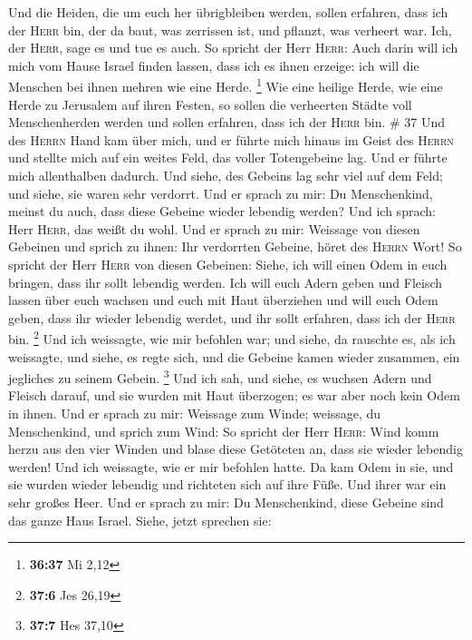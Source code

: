  Und die Heiden, die um euch her übrigbleiben werden,
sollen erfahren, dass ich der \textsc{Herr} bin, der da baut, was
zerrissen ist, und pflanzt, was verheert war. Ich, der \textsc{Herr},
sage es und tue es auch.  So spricht der Herr
\textsc{Herr}: Auch darin will ich mich vom Hause Israel finden lassen,
dass ich es ihnen erzeige: ich will die Menschen bei ihnen mehren wie
eine Herde. \footnote{\textbf{36:37} Mi 2,12}  Wie eine
heilige Herde, wie eine Herde zu Jerusalem auf ihren Festen, so sollen
die verheerten Städte voll Menschenherden werden und sollen erfahren,
dass ich der \textsc{Herr} bin. \# 37  Und des
\textsc{Herrn} Hand kam über mich, und er führte mich hinaus im Geist
des \textsc{Herrn} und stellte mich auf ein weites Feld, das voller
Totengebeine lag.  Und er führte mich allenthalben
dadurch. Und siehe, des Gebeins lag sehr viel auf dem Feld; und siehe,
sie waren sehr verdorrt.  Und er sprach zu mir: Du
Menschenkind, meinst du auch, dass diese Gebeine wieder lebendig werden?
Und ich sprach: Herr \textsc{Herr}, das weißt du wohl. 
Und er sprach zu mir: Weissage von diesen Gebeinen und sprich zu ihnen:
Ihr verdorrten Gebeine, höret des \textsc{Herrn} Wort!  So
spricht der Herr \textsc{Herr} von diesen Gebeinen: Siehe, ich will
einen Odem in euch bringen, dass ihr sollt lebendig werden.
 Ich will euch Adern geben und Fleisch lassen über euch
wachsen und euch mit Haut überziehen und will euch Odem geben, dass ihr
wieder lebendig werdet, und ihr sollt erfahren, dass ich der
\textsc{Herr} bin. \footnote{\textbf{37:6} Jes 26,19}  Und
ich weissagte, wie mir befohlen war; und siehe, da rauschte es, als ich
weissagte, und siehe, es regte sich, und die Gebeine kamen wieder
zusammen, ein jegliches zu seinem Gebein. \footnote{\textbf{37:7} Hes
  37,10}  Und ich sah, und siehe, es wuchsen Adern und
Fleisch darauf, und sie wurden mit Haut überzogen; es war aber noch kein
Odem in ihnen.  Und er sprach zu mir: Weissage zum Winde;
weissage, du Menschenkind, und sprich zum Wind: So spricht der Herr
\textsc{Herr}: Wind komm herzu aus den vier Winden und blase diese
Getöteten an, dass sie wieder lebendig werden!  Und ich
weissagte, wie er mir befohlen hatte. Da kam Odem in sie, und sie wurden
wieder lebendig und richteten sich auf ihre Füße. Und ihrer war ein sehr
großes Heer.  Und er sprach zu mir: Du Menschenkind,
diese Gebeine sind das ganze Haus Israel. Siehe, jetzt sprechen sie:
